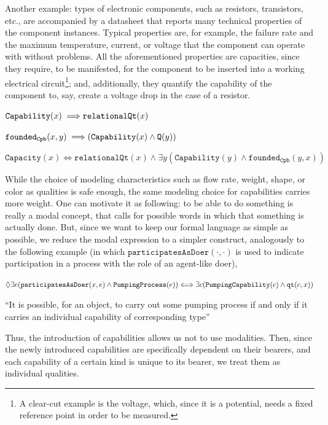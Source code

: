 \documentclass[sw]{iosart2x}
\newcommand{\bflist}{\begin{list}{}{\setlength{\topsep}{2mm}\setlength{\partopsep}{0mm}\setlength{\parsep}{0mm}\setlength{\leftmargin}{9mm}\setlength{\labelwidth}{8mm}}}
\newcommand{\eflist}{\end{list}}
\newcommand{\AxLabel}{\textrm{a}}
\newcommand{\ExLabel}{\textrm{ex}}
\newcounter{cntax}
\newcommand{\myax}[1]{\refstepcounter{cntax}\begin{small}{\bf \AxLabel\thecntax\label{ax:#1}}\end{small}}
\newcommand{\myex}[1]{\refstepcounter{cntex}\begin{small}{\bf \ExLabel\thecntex\label{ex:#1}}\end{small}}
\newcounter{cntex}
\newcommand{\mytext}[1]{``#1''}
\newcommand{\generalStyle}[1]{\texttt{#1}}
\newcommand{\biRel}[3]{\generalStyle{#1}(#2,#3)}
\newcommand{\uniRel}[2]{\generalStyle{#1}(#2)}
\newcommand{\biRelPar}[4]{\generalStyle{#1}_{\generalStyle{#4}}(#2,#3)}
\newcommand{\myiff}{\Longleftrightarrow}
\newcommand{\myfi}{\hspace{0.9mm} \Longrightarrow}
\newcommand{\DOLCEQuality}[1]{\uniRel{Q}{#1}}
\newcommand{\DOLCEQualityDirect}[2]{\biRel{qt}{#1}{#2}}
\newcommand{\Capability}[1]{\uniRel{Capability}{#1}}
\newcommand{\PumpingCapability}[1]{\uniRel{PumpingCapability}{#1}}
\newcommand{\PumpingProcess}[1]{\uniRel{PumpingProcess}{#1}}
\newcommand{\Capacity}[1]{\uniRel{Capacity}{#1}}
\newcommand{\RelationalQuality}[1]{\uniRel{relationalQt}{#1}}
\newcommand{\founded}[2]{\biRel{\foundedTerm{passive}}{#1}{#2}}
\newcommand{\participateAsDoer}[2]{\biRel{participatesAsDoer}{#1}{#2}}
\newcommand{\foundedCapab}[2]{\biRelPar{founded}{#1}{#2}{Cpb}}
\newcommand{\foundedTerm}[1]{%
  \ifthenelse{\equal{#1}{passive}}{founded}{%
    \ifthenelse{\equal{#1}{verb}}{found}{%
      \ifthenelse{\equal{#1}{gerund}}{founding}{%
        ERROR!%
      }%
    }%
  }%
}
\begin{document}
Another example: types of electronic components, such as resistors, transistors, etc., are accompanied by a datasheet that reports many technical properties of the component instances. 
Typical properties are, for example, the failure rate and the maximum temperature, current, or voltage that the component can operate with without problems. 
All the aforementioned properties are capacities, since they require, to be manifested, for the component to be inserted into a working electrical circuit\footnote{A clear-cut example is the voltage, which, since it is a potential, needs a fixed reference point in order to be measured.}; and, additionally, they quantify the capability of the component to, say, create a voltage drop in the case of a resistor. 
\bflist
\item[\myax{subsumptionCapab}] $ \Capability{x} \myfi  \RelationalQuality{x} $ 
\item[\myax{foundedCapabRange}] $ \foundedCapab{x}{y} \myfi (\Capability{x} \land \DOLCEQuality{y}) $
\item[\myax{subsumptionCapac}] $ \Capacity{x} \myiff  \RelationalQuality{x} \land \exists y(\Capability{y} \land \foundedCapab{y}{x}) $  %
\eflist

While the choice of modeling characteristics such as flow rate, weight, shape, or color as qualities is safe enough, the same modeling choice for capabilities carries more weight. 
One can motivate it as following: to be able to do something is really a modal concept, that calls for possible words in which that something is actually done. 
But, since we want to keep our formal language as simple as possible, we reduce the modal expression to a simpler construct, analogously to the following example (in which $\participateAsDoer{\cdot}{\cdot}$ is used to indicate participation in a process with the role of an agent-like doer),
\bflist
\item[\myex{Capab}] $ \lozenge \exists e(\participateAsDoer{x}{e} \land \\ \PumpingProcess{e}) \myiff \\ \exists c(\PumpingCapability{c} \land \DOLCEQualityDirect{c}{x}) $ 
\item \mytext{It is possible, for an object, to carry out some pumping process if and only if it carries an individual capability of corresponding type}
\eflist
Thus, the introduction of capabilities allows us not to use modalities. 
Then, since the newly introduced capabilities are specifically dependent on their bearers, and each capability of a certain kind is unique to its bearer, we treat them as individual qualities. 
\end{document}

